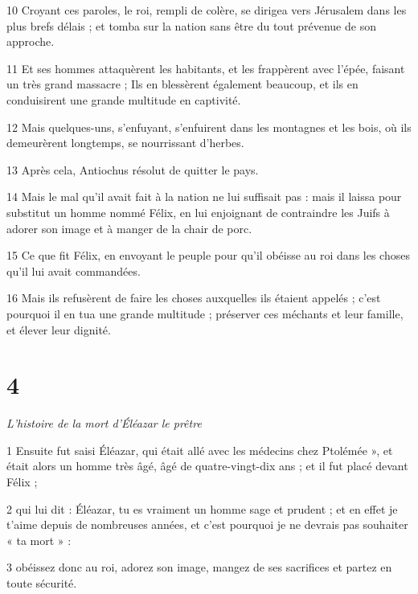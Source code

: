 \par 10 Croyant ces paroles, le roi, rempli de colère, se dirigea vers Jérusalem dans les plus brefs délais ; et tomba sur la nation sans être du tout prévenue de son approche.

\par 11 Et ses hommes attaquèrent les habitants, et les frappèrent avec l'épée, faisant un très grand massacre ; Ils en blessèrent également beaucoup, et ils en conduisirent une grande multitude en captivité.

\par 12 Mais quelques-uns, s'enfuyant, s'enfuirent dans les montagnes et les bois, où ils demeurèrent longtemps, se nourrissant d'herbes.

\par 13 Après cela, Antiochus résolut de quitter le pays.

\par 14 Mais le mal qu'il avait fait à la nation ne lui suffisait pas : mais il laissa pour substitut un homme nommé Félix, en lui enjoignant de contraindre les Juifs à adorer son image et à manger de la chair de porc.

\par 15 Ce que fit Félix, en envoyant le peuple pour qu'il obéisse au roi dans les choses qu'il lui avait commandées.

\par 16 Mais ils refusèrent de faire les choses auxquelles ils étaient appelés ; c'est pourquoi il en tua une grande multitude ; préserver ces méchants et leur famille, et élever leur dignité.

\chapter{4}

\par \textit{L'histoire de la mort d'Éléazar le prêtre}

\par 1 Ensuite fut saisi Éléazar, qui était allé avec les médecins chez Ptolémée », et était alors un homme très âgé, âgé de quatre-vingt-dix ans ; et il fut placé devant Félix ;

\par 2 qui lui dit : Éléazar, tu es vraiment un homme sage et prudent ; et en effet je t'aime depuis de nombreuses années, et c'est pourquoi je ne devrais pas souhaiter « ta mort » :

\par 3 obéissez donc au roi, adorez son image, mangez de ses sacrifices et partez en toute sécurité.

